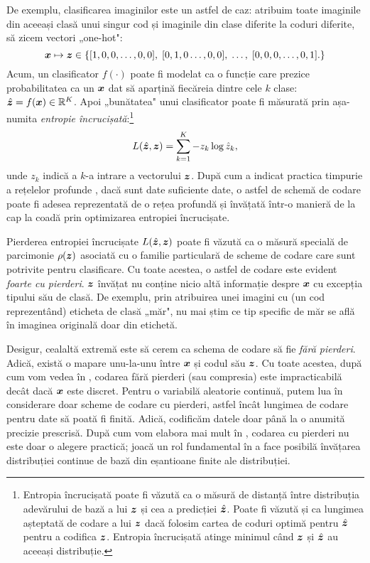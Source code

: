 \documentclass[../../book-main_ro.tex]{subfiles}
\begin{document}
\begin{example}
De exemplu, clasificarea imaginilor este un astfel de caz: atribuim toate imaginile din aceeași clasă unui singur cod și imaginile din clase diferite la coduri diferite, să zicem vectori „one-hot":
\begin{equation}
  \bm{x} \mapsto \bm{z} \in \{  [1, 0, 0, \ldots , 0, 0], \;  [0, 1, 0 \ldots, 0, 0], \; \ldots, \;  [0,0,0, \ldots, 0, 1].\}
  \label{eqn:class-labels}
\end{equation}
Acum, un clasificator $f(\cdot)$ poate fi modelat ca o funcție care prezice probabilitatea ca un $\bm{x}$ dat să aparțină fiecăreia dintre cele $k$ clase: $\hat{\bm{z}} = f(\bm{x}) \in \mathbb{R}^K$. Apoi „bunătatea" unui clasificator poate fi măsurată prin așa-numita {\em entropie încrucișată}:\footnote{Entropia încrucișată poate fi văzută ca o măsură de distanță între distribuția adevărului de bază a lui $\bm{z}$ și cea a predicției $\hat{\bm{z}}$. Poate fi văzută și ca lungimea așteptată de codare a lui $\bm{z}$ dacă folosim cartea de coduri optimă pentru $\hat {\bm{z}}$ pentru a codifica $\bm{z}$. Entropia încrucișată atinge minimul când $\bm{z}$ și $\hat {\bm{z}}$ au aceeași distribuție.}
\begin{equation}
    L(\hat{\bm{z}}, \bm{z}) = \sum_{k=1}^K - z_k \log \hat{z}_k,
\end{equation}
unde $z_k$ indică a $k$-a intrare a vectorului $\bm{z}$. După cum a indicat practica timpurie a rețelelor profunde \cite{krizhevsky2012imagenet}, dacă sunt date suficiente date, o astfel de schemă de codare poate fi adesea reprezentată de o rețea profundă și învățată într-o manieră de la cap la coadă prin optimizarea entropiei încrucișate.
\end{example}

Pierderea entropiei încrucișate $L(\hat {\bm{z}}, \bm{z})$ poate fi văzută ca o măsură specială de parcimonie $\rho(\bm{z})$ asociată cu o familie particulară de scheme de codare care sunt potrivite pentru clasificare. Cu toate acestea, o astfel de codare este evident {\em foarte cu pierderi}. $\bm{z}$ învățat nu conține nicio altă informație despre $\bm{x}$ cu excepția tipului său de clasă. De exemplu, prin atribuirea unei imagini cu (un cod reprezentând) eticheta de clasă „măr", nu mai știm ce tip specific de măr se află în imaginea originală doar din etichetă.

Desigur, cealaltă extremă este să cerem ca schema de codare să fie {\em fără pierderi}. Adică, există o mapare unu-la-unu între $\bm{x}$ și codul său $\bm{z}$. Cu toate acestea, după cum vom vedea în , codarea fără pierderi (sau compresia) este impracticabilă decât dacă $\bm{x}$ este discret. Pentru o variabilă aleatorie continuă, putem lua în considerare doar scheme de codare cu pierderi, astfel încât lungimea de codare pentru date să poată fi finită. Adică, codificăm datele doar până la o anumită precizie prescrisă. După cum vom elabora mai mult în , codarea cu pierderi nu este doar o alegere practică; joacă un rol fundamental în a face posibilă învățarea distribuției continue de bază din eșantioane finite ale distribuției.
\end{document}
